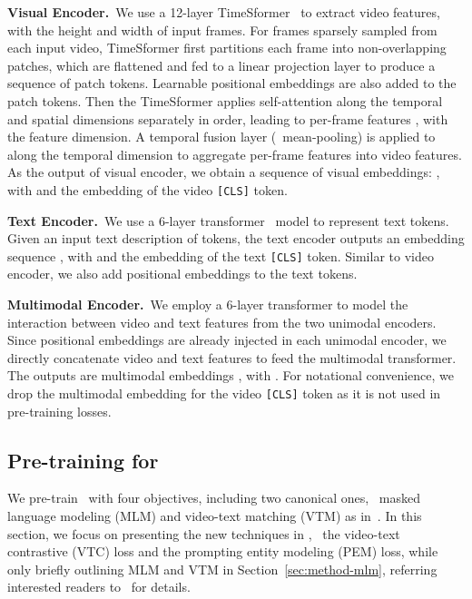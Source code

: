 \documentclass[10pt,twocolumn,letterpaper]{article}
\begin{document}
\noindent\textbf{Visual Encoder.}~We use a 12-layer TimeSformer~\cite{timesformer} to extract video features, with  the height and width of input frames. 
For  frames sparsely sampled from each input video, TimeSformer first partitions each frame into  non-overlapping patches, which are flattened and fed to a linear projection layer to produce a sequence of patch tokens.
Learnable positional embeddings are also added to the patch tokens. Then the TimeSformer applies self-attention along the temporal and spatial dimensions separately in order, leading to per-frame features , with  the feature dimension.
A temporal fusion layer (\ie~mean-pooling) is applied to  along the temporal dimension to aggregate per-frame features into video features.
As the output of visual encoder, we obtain a sequence of visual embeddings: , with  and  the embedding of the video \texttt{[CLS]} token.

\noindent\textbf{Text Encoder.}~We use a 6-layer transformer~\cite{transformer} model to represent text tokens. Given an input text description of  tokens, the text encoder outputs an embedding sequence , with  and  the embedding of the text \texttt{[CLS]} token. Similar to video encoder, we also add positional embeddings to the text tokens.

\noindent\textbf{Multimodal Encoder.}~We employ a 6-layer transformer to model the interaction between video and text features from the two unimodal encoders.
Since positional embeddings are already injected in each unimodal encoder, we directly concatenate video and text features to feed the multimodal transformer.
The outputs are multimodal embeddings , with .
For notational convenience, we drop the multimodal embedding for the video \texttt{[CLS]} token as it is not used in pre-training losses.

\subsection{Pre-training for \textbf{\name}}\label{sec:method-pt}
We pre-train \name~with four objectives, including two canonical ones, \ie~masked language modeling (MLM) and video-text matching (VTM) as in~\cite{sun2019videobert,zhu2020actbert,li2020hero,lei2021less}.
In this section, we focus on presenting the new techniques in \name, \ie~the video-text contrastive (VTC) loss and the prompting entity modeling (PEM) loss, while only briefly outlining MLM and VTM in Section~\ref{sec:method-mlm}, referring interested readers to~\cite{devlin2018bert,sun2019videobert,lei2021less} for details.
\end{document}

